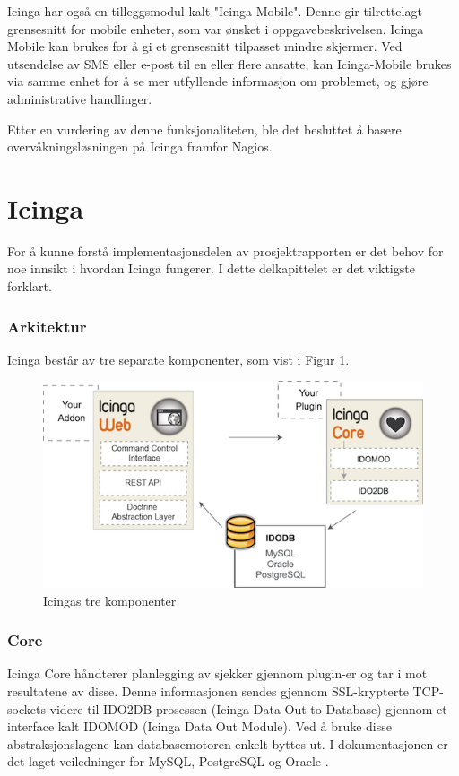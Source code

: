 Icinga har også en tilleggsmodul kalt "Icinga Mobile". Denne gir tilrettelagt grensesnitt for mobile enheter, som var ønsket i oppgavebeskrivelsen. Icinga Mobile kan brukes for å gi et grensesnitt tilpasset mindre skjermer. Ved utsendelse av SMS eller e-post til en eller flere ansatte, kan Icinga-Mobile brukes via samme enhet for å se mer utfyllende informasjon om problemet, og gjøre administrative handlinger.

Etter en vurdering av denne funksjonaliteten, ble det besluttet å basere overvåkningsløsningen på Icinga framfor Nagios.

\section{Icinga}
For å kunne forstå implementasjonsdelen av prosjektrapporten er det behov for noe innsikt i hvordan Icinga fungerer. I dette delkapittelet er det viktigste forklart.
\subsubsection{Arkitektur}
Icinga består av tre separate komponenter, som vist i Figur \ref{icingacomponents}.

\begin{figure}[H]
    \centering
    \includegraphics[scale=1.2]{img/icinga_architecture}
    \caption{Icingas tre komponenter}
    \label{icingacomponents}
\end{figure}


\subsubsection{Core}
Icinga Core håndterer planlegging av sjekker gjennom plugin-er og tar i mot resultatene av disse. Denne informasjonen sendes gjennom SSL-krypterte TCP-sockets videre til IDO2DB-prosessen (Icinga Data Out to Database) gjennom et interface kalt IDOMOD (Icinga Data Out Module). Ved å bruke disse abstraksjonslagene kan databasemotoren enkelt byttes ut. I dokumentasjonen er det laget veiledninger for MySQL, PostgreSQL og Oracle \cite{icingaarchitecture}.

